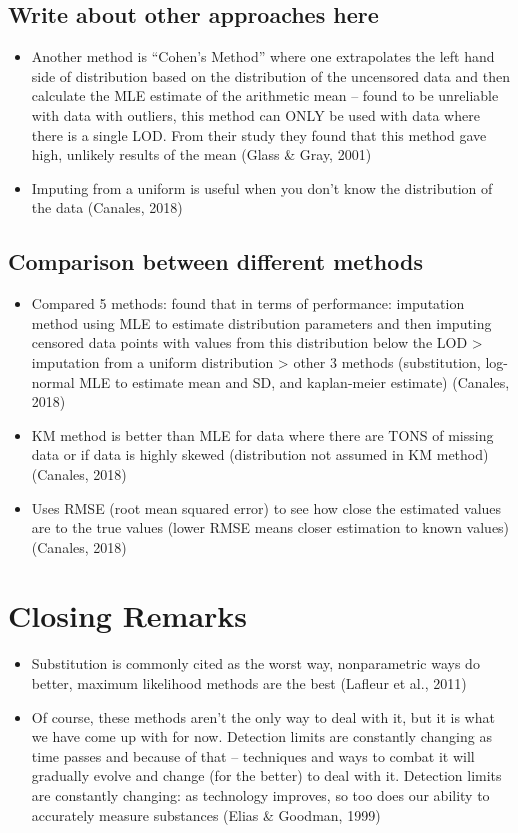 \documentclass[12pt, twoside]{amherstthesis}
\begin{document}
\hypertarget{write-about-other-approaches-here}{%
\subsection{Write about other approaches here}\label{write-about-other-approaches-here}}
\begin{itemize}
\item
  Another method is ``Cohen's Method'' where one extrapolates the left hand side of distribution based on the distribution of the uncensored data and then calculate the MLE estimate of the arithmetic mean -- found to be unreliable with data with outliers, this method can ONLY be used with data where there is a single LOD. From their study they found that this method gave high, unlikely results of the mean (Glass \& Gray, 2001)
\item
  Imputing from a uniform is useful when you don't know the distribution of the data (Canales, 2018)
\end{itemize}
\hypertarget{comparison-between-different-methods}{%
\subsection{Comparison between different methods}\label{comparison-between-different-methods}}
\begin{itemize}
\item
  Compared 5 methods: found that in terms of performance: imputation method using MLE to estimate distribution parameters and then imputing censored data points with values from this distribution below the LOD \textgreater{} imputation from a uniform distribution \textgreater{} other 3 methods (substitution, log-normal MLE to estimate mean and SD, and kaplan-meier estimate) (Canales, 2018)
\item
  KM method is better than MLE for data where there are TONS of missing data or if data is highly skewed (distribution not assumed in KM method) (Canales, 2018)
\item
  Uses RMSE (root mean squared error) to see how close the estimated values are to the true values (lower RMSE means closer estimation to known values) (Canales, 2018)
\end{itemize}
\hypertarget{closing-remarks}{%
\section{Closing Remarks}\label{closing-remarks}}
\begin{itemize}
\item
  Substitution is commonly cited as the worst way, nonparametric ways do better, maximum likelihood methods are the best (Lafleur et al., 2011)
\item
  Of course, these methods aren't the only way to deal with it, but it is what we have come up with for now. Detection limits are constantly changing as time passes and because of that -- techniques and ways to combat it will gradually evolve and change (for the better) to deal with it. Detection limits are constantly changing: as technology improves, so too does our ability to accurately measure substances (Elias \& Goodman, 1999)
\end{itemize}
\end{document}
